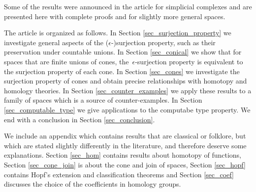\documentclass[english,11pt]{article}
\theoremstyle{plain}
\theoremstyle{remark}
\theoremstyle{definition}
\begin{document}
Some of the results were announced in the article \cite{AH22} for simplicial complexes and are presented here with complete proofs and for slightly more general spaces.

The article is organized as follows. In Section \ref{sec_surjection_property} we investigate general aspects of the ($\epsilon$-)surjection property, such as their preservation under countable unions. In Section \ref{sec_conical} we show that for spaces that are finite unions of cones, the~$\epsilon$-surjection property is equivalent to the surjection property of each cone. In Section \ref{sec_cones} we investigate the surjection property of cones and obtain precise relationships with homotopy and homology theories.  In Section \ref{sec_counter_examples} we apply these results to a family of spaces which is a source of counter-examples. In Section \ref{sec_computable_type} we give applications to the computabe type property. We end with a conclusion in Section \ref{sec_conclusion}.

We include an appendix which contains results that are classical or folklore, but which are stated slightly differently in the literature, and therefore deserve some explanations. Section \ref{sec_hom} contains results about homotopy of functions, Section \ref{sec_cone_join} is about the cone and join of spaces, Section \ref{sec_hopf} contains Hopf's extension and classification theorems and Section \ref{sec_coef} discusses the choice of the coefficients in homology groups.
\end{document}
